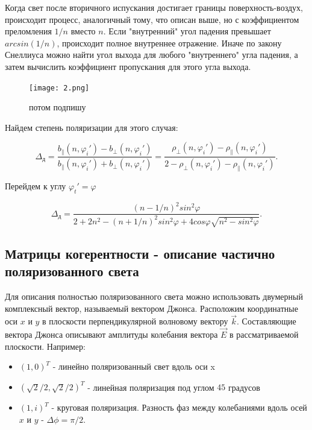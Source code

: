 \documentclass[a4paper]{article}
\begin{document}
Когда свет после вторичного испускания достигает границы поверхность-воздух, происходит процесс, аналогичный тому, что описан выше, но с коэффициентом преломления $1/n$ вместо $n$. Если "внутренний" угол падения превышает $arcsin(1/n)$, происходит полное внутреннее отражение. Иначе по закону Снеллиуса можно найти угол выхода для любого "внутреннего" угла падения, а затем вычислить коэффициент пропускания для этого угла выхода. 

\begin{figure}[htbp]
  \centering
  \texttt{[image: 2.png]}
  \caption{потом подпишу}
  \label{fig:2}
\end{figure}

Найдем степень поляризации для этого случая:

\begin{equation}
\Delta_{\text{д}} = \frac{b_{\parallel}(n, \varphi_i') - b_{\perp}(n, \varphi_i')}{b_{\parallel}(n, \varphi_i') + b_{\perp}(n, \varphi_i')} = \frac{\rho_{\perp}(n, \varphi_i') - \rho_{\parallel}(n, \varphi_i')}{2 - \rho_{\perp}(n, \varphi_i') - \rho_{\parallel}(n, \varphi_i')}.
\end{equation}

Перейдем к углу $\varphi_t' = \varphi$

\begin{equation}
\Delta_{\text{д}} = \frac{(n-1/n)^2 sin^2 \varphi}{2+2n^2 - (n+1/n)^2sin^2\varphi + 4cos\varphi \sqrt{n^2 - sin^2\varphi}}.
\end{equation}

\subsection*{\textcolor{sub_header}{Матрицы когерентности - описание частично поляризованного света}}

Для описания полностью поляризованного света можно использовать двумерный комплексный вектор, называемый \textcolor{defenition}{вектором Джонса}. Расположим координатные оси $x$ и $y$ в плоскости перпендикулярной волновому вектору $\vec{k}$. Составляющие вектора Джонса описывают амплитуды колебания вектора $\vec{E}$ в рассматриваемой плоскости. Например:
\begin{itemize}
    \item $(1, 0)^{T}$ - линейно поляризованный свет вдоль оси x
    \item  $(\sqrt{2} / 2, \sqrt{2} / 2)^{T}$ - линейная поляризация под углом $45$ градусов
    \item $(1, i)^{T}$ - круговая поляризация. Разность фаз между колебаниями вдоль осей $x$ и $y$ - $\Delta \phi = \pi / 2$.
\end{itemize}
\end{document}
